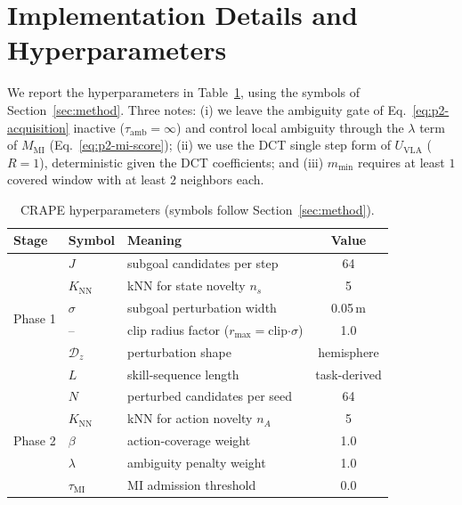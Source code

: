 \documentclass{article}
\begin{document}
\section{Implementation Details and Hyperparameters}
\label{app:hparams}

We report the hyperparameters in Table~\ref{tab:hparams}, using the symbols of
Section~\ref{sec:method}. Three notes: (i) we leave the ambiguity gate of
Eq.~\eqref{eq:p2-acquisition} inactive ($\tau_{\mathrm{amb}}{=}\infty$) and control
local ambiguity through the $\lambda$ term of $M_{\mathrm{MI}}$
(Eq.~\eqref{eq:p2-mi-score}); (ii) we use the DCT single step form of
$U_{\mathrm{VLA}}$ ($R{=}1$), deterministic given the DCT coefficients; and (iii)
$m_{\min}$ requires at least $1$ covered window with at least $2$ neighbors each.

\begin{table}[h]
\centering
\caption{CRAPE hyperparameters (symbols follow Section~\ref{sec:method}).}
\label{tab:hparams}
\small
\setlength{\tabcolsep}{6pt}
\begin{tabular}{lllc}
\toprule
\textbf{Stage} & \textbf{Symbol} & \textbf{Meaning} & \textbf{Value} \\
\midrule
\multirow{6}{*}{Phase 1}
 & $J$               & subgoal candidates per step                        & 64 \\
 & $K_{\mathrm{NN}}$ & kNN for state novelty $n_s$                        & 5 \\
 & $\sigma$          & subgoal perturbation width                         & 0.05\,m \\
 & --                & clip radius factor ($r_{\max}{=}$clip$\cdot\sigma$) & 1.0 \\
 & $\mathcal{D}_z$   & perturbation shape                                 & hemisphere \\
 & $L$               & skill-sequence length                              & task-derived \\
\midrule
\multirow{8}{*}{Phase 2}
 & $N$               & perturbed candidates per seed                      & 64 \\
 & $K_{\mathrm{NN}}$ & kNN for action novelty $n_A$                       & 5 \\
 & $\beta$           & action-coverage weight                             & 1.0 \\
 & $\lambda$         & ambiguity penalty weight                           & 1.0 \\
 & $\tau_{\mathrm{MI}}$  & MI admission threshold                         & 0.0 \\

\end{tabular}
\end{table}
\end{document}
